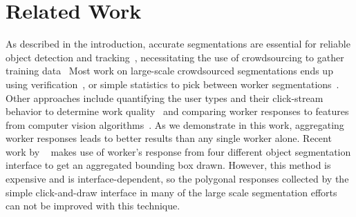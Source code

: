 \documentclass[letterpaper]{article} %
\begin{document}
\section{Related Work}


\par As described in the introduction, accurate segmentations are essential for reliable 
object detection and tracking~\cite{sivic2005discovering,felzenszwalb2008discriminatively,viola2004robust,torralba2004sharing,torralba2003contextual,fe2003bayesian,Bearman2016}, necessitating the use of crowdsourcing to gather training data~\cite{AdrianaKovashka2016}
Most work on large-scale crowdsourced segmentations ends up using 
verification~\cite{Lin2014,MartinFTM01,Torralba2010,pascal-voc-2012,Li2009}, 
or simple statistics to pick between worker segmentations~\cite{Vittayakorn2011}.
Other approaches include quantifying the user types and their click-stream behavior 
to determine work quality~\cite{Cabezas2015,Sameki2015}
and comparing worker responses to features from computer vision algorithms~\cite{Vittayakorn2011,Russakovsky2015}. As we demonstrate in this work, aggregating worker responses leads to better results than any single worker alone. Recent work by ~\cite{Song2018} makes use of worker's response from four different object segmentation interface to get an aggregated bounding box drawn. However, this method is expensive and is interface-dependent, so the polygonal responses collected by the simple click-and-draw  interface in many of the large scale segmentation efforts can not be improved with this technique. 
\end{document}
